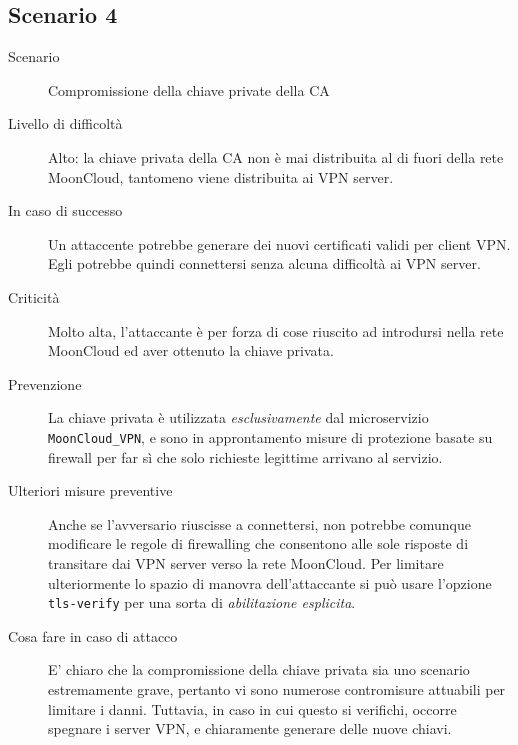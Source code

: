 \subsection{Scenario 4}
\begin{description}
    \item[Scenario]Compromissione della chiave private della CA
    \item[Livello di difficoltà]Alto: la chiave privata della CA 
    non è mai distribuita al di fuori della rete MoonCloud, tantomeno
    viene distribuita ai VPN server.
    \item[In caso di successo]Un attaccente potrebbe generare dei nuovi
    certificati validi per client VPN. Egli potrebbe quindi connettersi
    senza alcuna difficoltà ai VPN server.
    \item[Criticità]Molto alta, l'attaccante è per forza di cose riuscito 
    ad introdursi nella rete MoonCloud ed aver ottenuto la chiave privata. 
    \item[Prevenzione]La chiave privata è utilizzata \textit{esclusivamente}
    dal microservizio \texttt{MoonCloud\_VPN}, e sono in approntamento
    misure di protezione basate su firewall per far sì che
    solo richieste legittime arrivano al servizio.
    \item[Ulteriori misure preventive]Anche se l'avversario riuscisse a connettersi,
    non potrebbe
    comunque modificare le regole di firewalling che consentono
    alle sole risposte di transitare dai VPN server verso la rete MoonCloud.
    Per limitare ulteriormente lo spazio di manovra dell'attaccante
    si può usare l'opzione \texttt{tls-verify} per una sorta di \textit{abilitazione
    esplicita}.
    \item[Cosa fare in caso di attacco]E' chiaro che la compromissione della
    chiave privata sia uno scenario estremamente grave, pertanto vi sono
    numerose contromisure attuabili per limitare i danni. Tuttavia, in
    caso in cui questo si verifichi, occorre spegnare i server VPN, e
    chiaramente generare delle nuove chiavi.
\end{description}